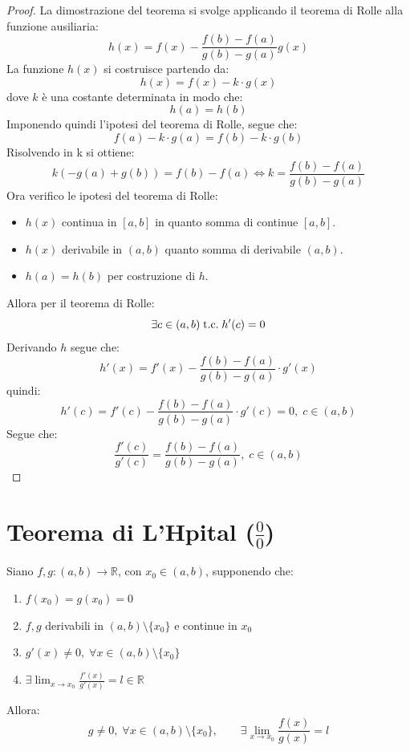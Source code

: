 \documentclass[a4paper,12pt,openright]{book}
\begin{document}
	\begin{proof}
		La dimostrazione del teorema si svolge applicando il teorema di Rolle alla funzione ausiliaria:
		\[h(x) = f(x) - \frac{f(b) - f(a)}{g(b) - g(a)}g(x)\]
		La funzione $h(x)$ si costruisce partendo da:
		\[h(x) = f(x) - k \cdot g(x)\]
		dove $k$ è una costante determinata in modo che:
		\[h(a) = h(b)\]
		Imponendo quindi l'ipotesi del teorema di Rolle, segue che: 
		\[f(a) - k \cdot g(a) = f(b) - k \cdot g(b)\]
		Risolvendo in k si ottiene:
		\[k (- g(a) + g(b)) = f(b) - f(a) \iff k = \frac{f(b) - f(a)}{g(b) - g(a)}\]
		Ora verifico le ipotesi del teorema di Rolle:
		\begin{itemize}
			\item $h(x)$ continua in $[a, b]$ in quanto somma di continue $[a, b]$.
			\item $h(x)$ derivabile in $(a, b)$ quanto somma di derivabile $(a, b)$.
			\item $h(a) = h(b)$ per costruzione di $h$.
		\end{itemize}
		Allora per il teorema di Rolle:
		\[\exists c \in (a, b) \;\text{t.c.}\; h'(c) = 0\]
		Derivando $h$ segue che:
		\[h'(x) = f'(x) - \frac{f(b) - f(a)}{g(b) - g(a)} \cdot g'(x)\]
		quindi:
		\[h'(c) = f'(c) - \frac{f(b) - f(a)}{g(b) - g(a)} \cdot g'(c) = 0, \; c \in (a, b)\]
		Segue che:
		\[\frac{f'(c)}{g'(c)} = \frac{f(b) - f(a)}{g(b) - g(a)}, \; c \in (a, b)\]
	\end{proof}
	
	\newpage
	
	\section{Teorema di L'Hpital ($\frac{0}{0}$)}
	Siano $f, g: (a, b) \longrightarrow \mathbb{R}$, con $x_0 \in (a, b)$, supponendo che:
	\begin{enumerate}[label=\roman*)]
		\item $f(x_0) = g(x_0) = 0$
		\item $f, g$ derivabili in $(a, b) \setminus \{x_0\}$ e continue in $x_0$
		\item $g'(x) \not = 0, \; \forall x \in (a, b) \setminus \{x_0\}$
		\item $\exists \lim_{x \rightarrow x_0} \frac{f'(x)}{g'(x)} = l \in \mathbb{R}$
	\end{enumerate}
	Allora:
	\[g \not = 0, \; \forall x \in (a,b) \setminus \{x_0\}, \quad \quad \exists \lim_{x \rightarrow x_0} \frac{f(x)}{g(x)} = l\]
	
\end{document}
